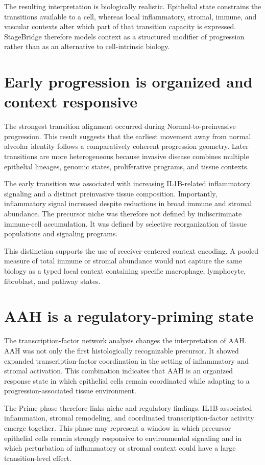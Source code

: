 The resulting interpretation is biologically realistic. Epithelial state constrains the transitions available to a cell, whereas local inflammatory, stromal, immune, and vascular contexts alter which part of that transition capacity is expressed. StageBridge therefore models context as a structured modifier of progression rather than as an alternative to cell-intrinsic biology.

\section{Early progression is organized and context responsive}

The strongest transition alignment occurred during Normal-to-preinvasive progression. This result suggests that the earliest movement away from normal alveolar identity follows a comparatively coherent progression geometry. Later transitions are more heterogeneous because invasive disease combines multiple epithelial lineages, genomic states, proliferative programs, and tissue contexts.

The early transition was associated with increasing IL1B-related inflammatory signaling and a distinct preinvasive tissue composition. Importantly, inflammatory signal increased despite reductions in broad immune and stromal abundance. The precursor niche was therefore not defined by indiscriminate immune-cell accumulation. It was defined by selective reorganization of tissue populations and signaling programs.

This distinction supports the use of receiver-centered context encoding. A pooled measure of total immune or stromal abundance would not capture the same biology as a typed local context containing specific macrophage, lymphocyte, fibroblast, and pathway states.

\section{AAH is a regulatory-priming state}

The transcription-factor network analysis changes the interpretation of AAH. AAH was not only the first histologically recognizable precursor. It showed expanded transcription-factor coordination in the setting of inflammatory and stromal activation. This combination indicates that AAH is an organized response state in which epithelial cells remain coordinated while adapting to a progression-associated tissue environment.

The Prime phase therefore links niche and regulatory findings. IL1B-associated inflammation, stromal remodeling, and coordinated transcription-factor activity emerge together. This phase may represent a window in which precursor epithelial cells remain strongly responsive to environmental signaling and in which perturbation of inflammatory or stromal context could have a large transition-level effect.

